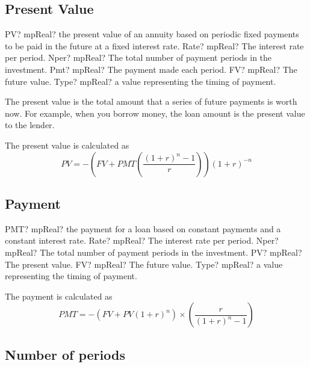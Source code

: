 \subsection{Present Value}

\begin{mpFunctionsExtract}
	\mpWorksheetFunctionFiveNotImplemented
	{PV? mpReal? the present value of an annuity based on periodic fixed payments to be paid in the future at a fixed interest rate.}
	{Rate? mpReal? The interest rate per period.}
	{Nper? mpReal? The total number of payment periods in the investment.}
	{Pmt? mpReal? The payment made each period.}
	{FV? mpReal? The future value.}
	{Type? mpReal? a value representing the timing of payment.}
\end{mpFunctionsExtract}

\vspace{0.3cm}
The present value is the total amount that a series of future payments is worth now. For example, when you borrow money, the loan amount is the present value to the lender.

The present value is calculated as
\begin{equation}
	PV = - \left( FV+ PMT \left( \frac{(1+r)^n - 1}{r} \right) \right)   (1+r)^{-n} 
\end{equation}




\subsection{Payment}

\begin{mpFunctionsExtract}
	\mpWorksheetFunctionFiveNotImplemented
	{PMT? mpReal? the payment for a loan based on constant payments and a constant interest rate.}
	{Rate? mpReal? The interest rate per period.}
	{Nper? mpReal? The total number of payment periods in the investment.}
	{PV? mpReal? The present value.}
	{FV? mpReal? The future value.}
	{Type? mpReal? a value representing the timing of payment.}
\end{mpFunctionsExtract}

\vspace{0.3cm}
The payment is calculated as
\begin{equation}
	PMT = - \left( FV + PV(1+r)^n \right) \times \left( \frac{r}{(1+r)^n - 1} \right)
\end{equation}




\subsection{Number of periods}

